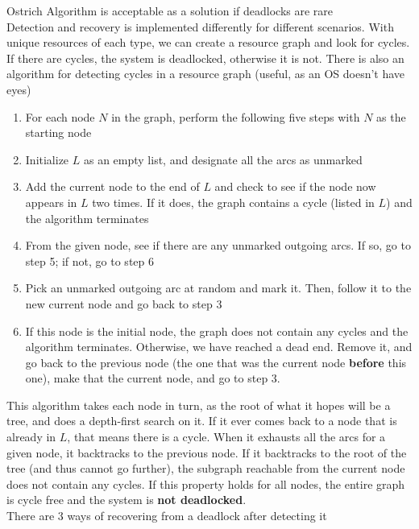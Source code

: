 \documentclass{article}
\begin{document}
Ostrich Algorithm is acceptable as a solution if deadlocks are rare
\\Detection and recovery is implemented differently for different scenarios. With unique resources of each type, we can create a resource graph and look for cycles. If there are cycles, the system is deadlocked, otherwise it is not. There is also an algorithm for detecting cycles in a resource graph (useful, as an OS doesn't have eyes)
\begin{enumerate}
	\item For each node $N$ in the graph, perform the following five steps with $N$ as the starting node
	\item Initialize $L$ as an empty list, and designate all the arcs as unmarked
	\item Add the current node to the end of $L$ and check to see if the node now appears in $L$ two times. If it does, the graph contains a cycle (listed in $L$) and the algorithm terminates
	\item From the given node, see if there are any unmarked outgoing arcs. If so, go to step 5; if not, go to step 6
	\item Pick an unmarked outgoing arc at random and mark it. Then, follow it to the new current node and go back to step 3
	\item If this node is the initial node, the graph does not contain any cycles and the algorithm terminates. Otherwise, we have reached a dead end. Remove it, and go back to the previous node (the one that was the current node \textbf{before} this one), make that the current node, and go to step 3.
\end{enumerate}
This algorithm takes each node in turn, as the root of what it hopes will be a tree, and does a depth-first search on it. If it ever comes back to a node that is already in $L$, that means there is a cycle. When it exhausts all the arcs for a given node, it backtracks to the previous node. If it backtracks to the root of the tree (and thus cannot go further), the subgraph reachable from the current node does not contain any cycles. If this property holds for all nodes, the entire graph is cycle free and the system is \textbf{not deadlocked}.
\\There are 3 ways of recovering from a deadlock after detecting it
\end{document}
